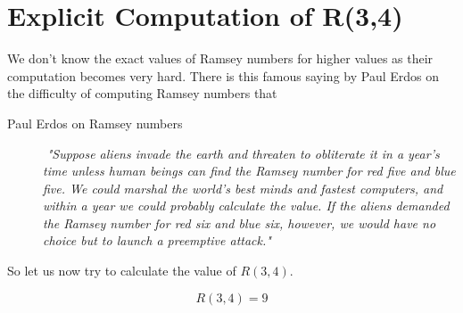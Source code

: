 \section{Explicit Computation of R(3,4)}
We don't know the exact values of Ramsey numbers for higher values as their computation becomes very hard. There is this famous saying by Paul Erdos on the difficulty of computing Ramsey numbers that
\begin{description}
   \item[Paul Erdos on Ramsey numbers] 
   $ $ \newline
\textit{   "Suppose aliens invade the earth and threaten to obliterate it in a year's time unless human beings can find the Ramsey number for red five and blue five. We could marshal the world's best minds and fastest computers, and within a year we could probably calculate the value. If the aliens demanded the Ramsey number for red six and blue six, however, we would have no choice but to launch a preemptive attack."}
\end{description}
 So let us now try to calculate the value of $R(3,4)$. 
 \begin{claim}
 $$ R(3,4) = 9 $$
 \end{claim}
